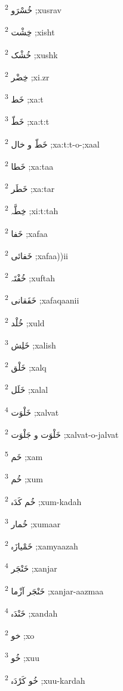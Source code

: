 \documentclass[12pt]{article}
\begin{document}
\begin{multicols}{5}
{\ur خُسْرَو}   \textsuperscript{2} ;xusrav

{\ur خِشْت}   \textsuperscript{2} ;xisht

{\ur خُشْک}   \textsuperscript{2} ;xushk

{\ur خِضْر}   \textsuperscript{2} ;xi.zr

{\ur خَط}   \textsuperscript{3} ;xa:t

{\ur خَطّ}   \textsuperscript{3} ;xa:t:t

{\ur خَطّ و خال}   \textsuperscript{2} ;xa:t:t-o-;xaal

{\ur خَطا}   \textsuperscript{2} ;xa:taa

{\ur خَطَر}   \textsuperscript{2} ;xa:tar

{\ur خِطَّہ}   \textsuperscript{2} ;xi:t:tah

{\ur خَفا}   \textsuperscript{2} ;xafaa

{\ur خَفائی}   \textsuperscript{2} ;xafaa))ii

{\ur خُفْتَہ}   \textsuperscript{2} ;xuftah

{\ur خَفَقانی}   \textsuperscript{2} ;xafaqaanii

{\ur خُلْد}   \textsuperscript{2} ;xuld

{\ur خَلِش}   \textsuperscript{3} ;xalish

{\ur خَلْق}   \textsuperscript{2} ;xalq

{\ur خَلَل}   \textsuperscript{2} ;xalal

{\ur خَلْوَت}   \textsuperscript{4} ;xalvat

{\ur خَلْوَت و جَلْوَت}   \textsuperscript{2} ;xalvat-o-jalvat

{\ur خَم}   \textsuperscript{5} ;xam

{\ur خُم}   \textsuperscript{3} ;xum

{\ur خُم کَدَہ}   \textsuperscript{2} ;xum-kadah

{\ur خُمار}   \textsuperscript{3} ;xumaar

{\ur خَمْیازَہ}   \textsuperscript{2} ;xamyaazah

{\ur خَنْجَر}   \textsuperscript{4} ;xanjar

{\ur خَنْجَر آزْما}   \textsuperscript{2} ;xanjar-aazmaa

{\ur خَنْدَہ}   \textsuperscript{4} ;xandah

{\ur خو}   \textsuperscript{2} ;xo

{\ur خُو}   \textsuperscript{3} ;xuu

{\ur خُو کَرْدَہ}   \textsuperscript{2} ;xuu-kardah


\end{multicols}
\end{document}
